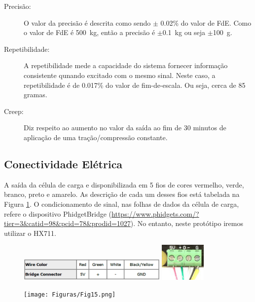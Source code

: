\documentclass{article}
\begin{document}
\begin{description}
\item[Precisão:] O valor da precisão é descrita como sendo $\pm$ 0.02\% do valor de FdE. Como o valor de FdE é 500~kg, então a precisão é $\pm$0.1~kg ou seja $\pm$100~g.

\item[Repetibilidade:] A repetibilidade mede a capacidade do sistema fornecer informação consistente qunando excitado com o mesmo sinal. Neste caso, a repetibilidade é de 0.017\% do valor de fim-de-escala. Ou seja, cerca de 85 gramas. 

\item[Creep:] Diz respeito ao aumento no valor da saída ao fim de 30 minutos de aplicação de uma tração/compressão constante.


\end{description}

\subsection{Conectividade Elétrica}

A saída da célula de carga e disponibilizada em 5 fios de cores vermelho, verde, branco, preto e amarelo. As descrição de cada um desses fios está tabelada na Figura \ref{fig:fig12}. O condicionamento de sinal, nas folhas de dados da célula de carga, refere o dispositivo PhidgetBridge (\url{https://www.phidgets.com/?tier=3&catid=98&pcid=78&prodid=1027}). No entanto, neste protótipo iremos utilizar o HX711.

\begin{figure}[htb!]
\centering
\includegraphics[width=0.65\textwidth]{Figuras/Fig12.png}
\includegraphics[width=0.2\textwidth]{Figuras/Fig13.png}
\label{fig:fig12}
\end{figure}


\begin{figure}[htb!]
\centering
\texttt{[image: Figuras/Fig15.png]}
\label{fig:fig15}
\end{figure}
\end{document}
